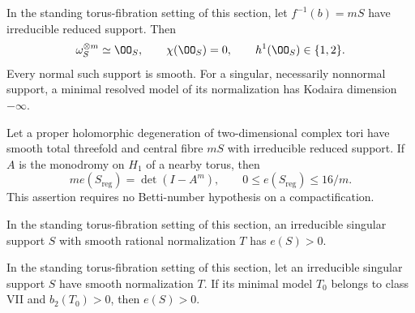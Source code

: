
\begin{proposition}[P4.12]\hypertarget{tag-02WJ}{}\label{night:P4.12}\label{stmt:P4.12}


In the standing torus-fibration setting of this section, let $f^{-1}(b)=mS$
have irreducible reduced support. Then
\[
 \omega_S^{\otimes m}\simeq\OO_S,\qquad
 \chi(\OO_S)=0,\qquad h^1(\OO_S)\in\{1,2\}.
\]
Every normal such support is smooth. For a singular, necessarily
nonnormal support, a minimal resolved model of its normalization
has Kodaira dimension $-\infty$.
\end{proposition}

\begin{proposition}[P4.13]\hypertarget{tag-02WK}{}\label{night:P4.13}\label{stmt:P4.13}


Let a proper holomorphic degeneration of two-dimensional complex
tori have smooth total threefold and central fibre $mS$ with
irreducible reduced support. If $A$ is the monodromy on $H_1$ of
a nearby torus, then
\[
 m e(S_{\mathrm{reg}})=\det(I-A^m),\qquad
 0\le e(S_{\mathrm{reg}})\le16/m.
\]
This assertion requires no Betti-number hypothesis on a compactification.
\end{proposition}

\begin{proposition}[P4.21]\hypertarget{tag-02WT}{}\label{night:P4.21}\label{stmt:P4.21}


In the standing torus-fibration setting of this section, an irreducible singular support $S$
with smooth rational normalization $T$ has $e(S)>0$.
\end{proposition}

\begin{proposition}[P4.23]\hypertarget{tag-02WV}{}\label{night:P4.23}\label{stmt:P4.23}


In the standing torus-fibration setting of this section, let an irreducible singular support
$S$ have smooth normalization $T$. If its minimal model $T_0$
belongs to class VII and $b_2(T_0)>0$, then $e(S)>0$.
\end{proposition}

